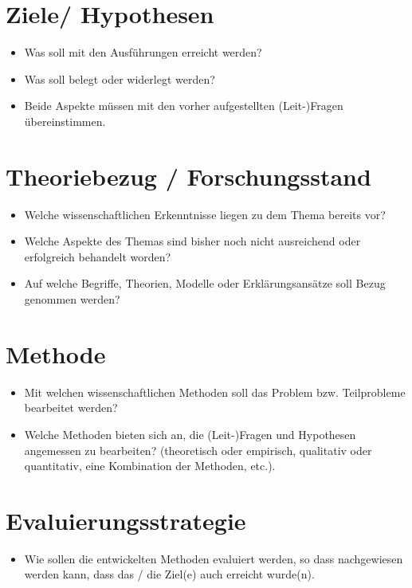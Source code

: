 \section{Ziele/ Hypothesen}
\begin{itemize}
\item Was soll mit den Ausführungen erreicht werden?
\item Was soll belegt oder widerlegt werden?
\item Beide Aspekte müssen mit den vorher aufgestellten (Leit-)Fragen übereinstimmen.
\end{itemize}

\section{Theoriebezug / Forschungsstand}
\begin{itemize}
\item Welche wissenschaftlichen Erkenntnisse liegen zu dem Thema bereits vor?
\item Welche Aspekte des Themas sind bisher noch nicht ausreichend oder erfolgreich behandelt worden? 
\item Auf welche Begriffe, Theorien, Modelle oder Erklärungsansätze soll Bezug genommen werden?
\end{itemize}

\section{Methode}
\begin{itemize}
\item Mit welchen wissenschaftlichen Methoden soll das Problem bzw. Teilprobleme bearbeitet werden?
\item Welche Methoden bieten sich an, die (Leit-)Fragen und Hypothesen angemessen zu
bearbeiten? (theoretisch oder empirisch, qualitativ oder quantitativ, eine Kombination der
Methoden, etc.).
\end{itemize}

\section{Evaluierungsstrategie}
\begin{itemize}
\item Wie sollen die entwickelten Methoden evaluiert werden, so dass nachgewiesen werden
kann, dass das / die Ziel(e) auch erreicht wurde(n).
\end{itemize}






